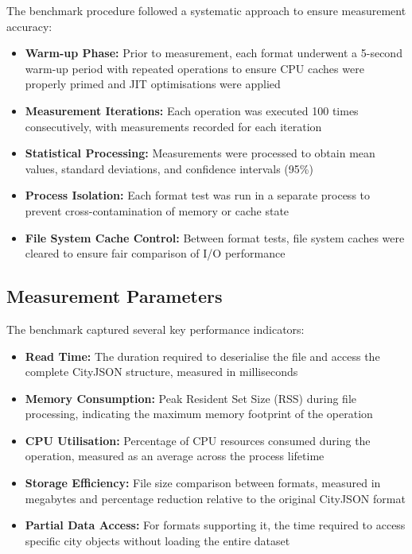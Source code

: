 The benchmark procedure followed a systematic approach to ensure measurement accuracy:

\begin{itemize}
  \item \textbf{Warm-up Phase:} Prior to measurement, each format underwent a 5-second warm-up period with repeated operations to ensure CPU caches were properly primed and JIT optimisations were applied

  \item \textbf{Measurement Iterations:} Each operation was executed 100 times consecutively, with measurements recorded for each iteration

  \item \textbf{Statistical Processing:} Measurements were processed to obtain mean values, standard deviations, and confidence intervals (95\%)

  \item \textbf{Process Isolation:} Each format test was run in a separate process to prevent cross-contamination of memory or cache state

  \item \textbf{File System Cache Control:} Between format tests, file system caches were cleared to ensure fair comparison of I/O performance
\end{itemize}

\subsection{Measurement Parameters}
\label{result:benchmark_on_local_environment:measurement_parameters}

The benchmark captured several key performance indicators:

\begin{itemize}
  \item \textbf{Read Time:} The duration required to deserialise the file and access the complete CityJSON structure, measured in milliseconds

  \item \textbf{Memory Consumption:} Peak Resident Set Size (RSS) during file processing, indicating the maximum memory footprint of the operation

  \item \textbf{CPU Utilisation:} Percentage of CPU resources consumed during the operation, measured as an average across the process lifetime

  \item \textbf{Storage Efficiency:} File size comparison between formats, measured in megabytes and percentage reduction relative to the original CityJSON format

  \item \textbf{Partial Data Access:} For formats supporting it, the time required to access specific city objects without loading the entire dataset
\end{itemize}

